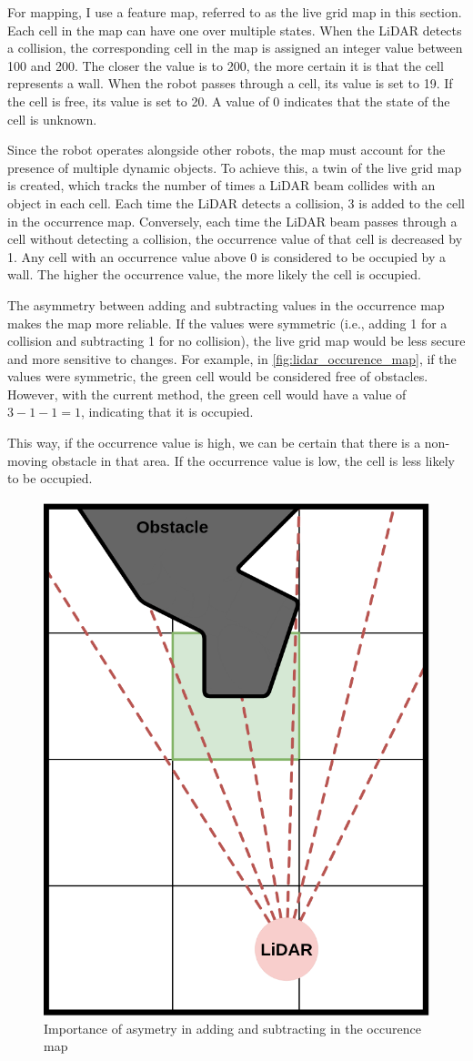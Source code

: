 \documentclass[../main.tex]{subfiles}
\begin{document}
For mapping, I use a feature map, referred to as the live grid map in this section. Each cell in the map can have one over multiple states. When the LiDAR detects a collision, the corresponding cell in the map is assigned an integer value between 100 and 200. The closer the value is to 200, the more certain it is that the cell represents a wall. When the robot passes through a cell, its value is set to 19. If the cell is free, its value is set to 20. A value of 0 indicates that the state of the cell is unknown.

\vspace{1em}

Since the robot operates alongside other robots, the map must account for the presence of multiple dynamic objects. To achieve this, a twin of the live grid map is created, which tracks the number of times a LiDAR beam collides with an object in each cell. Each time the LiDAR detects a collision, 3 is added to the cell in the occurrence map. Conversely, each time the LiDAR beam passes through a cell without detecting a collision, the occurrence value of that cell is decreased by 1. Any cell with an occurrence value above 0 is considered to be occupied by a wall. The higher the occurrence value, the more likely the cell is occupied.

\vspace{1em}

The asymmetry between adding and subtracting values in the occurrence map makes the map more reliable. If the values were symmetric (i.e., adding 1 for a collision and subtracting 1 for no collision), the live grid map would be less secure and more sensitive to changes. For example, in \autoref{fig:lidar_occurence_map}, if the values were symmetric, the green cell would be considered free of obstacles. However, with the current method, the green cell would have a value of $3-1-1=1$, indicating that it is occupied.

\vspace{1em}

This way, if the occurrence value is high, we can be certain that there is a non-moving obstacle in that area. If the occurrence value is low, the cell is less likely to be occupied.

\begin{figure}[H]
	\centering
	\includegraphics[width=0.4\linewidth]{IMAGES/part5/lidar_occurance_map.png}
	\caption{Importance of asymetry in adding and subtracting in the occurence map}
	\label{fig:lidar_occurence_map}
\end{figure}
\end{document}
